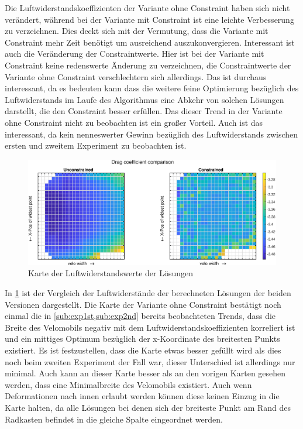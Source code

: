 Die Luftwiderstandskoeffizienten der Variante ohne Constraint haben sich nicht verändert, während bei der Variante mit Constraint ist eine leichte Verbesserung zu verzeichnen.
Dies deckt sich mit der Vermutung, dass die Variante mit Constraint mehr Zeit benötigt um ausreichend auszukonvergieren.
Interessant ist auch die Veränderung der Constraintwerte.
Hier ist bei der Variante mit Constraint keine redenswerte Änderung zu verzeichnen, die Constraintwerte der Variante ohne Constraint verschlechtern sich allerdings.
Das ist durchaus interessant, da es bedeuten kann dass die weitere feine Optimierung bezüglich des Luftwiderstands im Laufe des Algorithmus eine Abkehr von solchen Lösungen darstellt, die den Constraint besser erfüllen.
Das dieser Trend in der Variante ohne Constraint nicht zu beobachten ist ein großer Vorteil.
Auch ist das interessant, da kein nenneswerter Gewinn bezüglich des Luftwiderstands zwischen ersten und zweitem Experiment zu beobachten ist.

\begin{figure}[h]
	\includegraphics[width=1\linewidth]{bilder/6pt1000Samples/dragMapComparison}
	\caption{Karte der Luftwiderstandswerte der Lösungen}
	\label{fig:3rdmapDrag}
\end{figure}

In \cref{fig:3rdmapDrag} ist der Vergleich der Luftwiderstände der berechneten Lösungen der beiden Versionen dargestellt.
Die Karte der Variante ohne Constraint bestätigt noch einmal die in \cref{sub:exp1st,sub:exp2nd} bereits beobachteten Trends, dass die Breite des Velomobils negativ mit dem Luftwiderstandskoeffizienten korreliert ist und ein mittiges Optimum bezüglich der x-Koordinate des breitesten Punkts existiert.
Es ist festzustellen, dass die Karte etwas besser gefüllt wird als dies noch beim zweiten Experiment der Fall war, dieser Unterschied ist allerdings nur minimal.
Auch kann an dieser Karte besser als an den vorigen Karten gesehen werden, dass eine Minimalbreite des Velomobils existiert.
Auch wenn Deformationen nach innen erlaubt werden können diese keinen Einzug in die Karte halten, da alle Lösungen bei denen sich der breiteste Punkt am Rand des Radkasten befindet in die gleiche Spalte eingeordnet werden.

